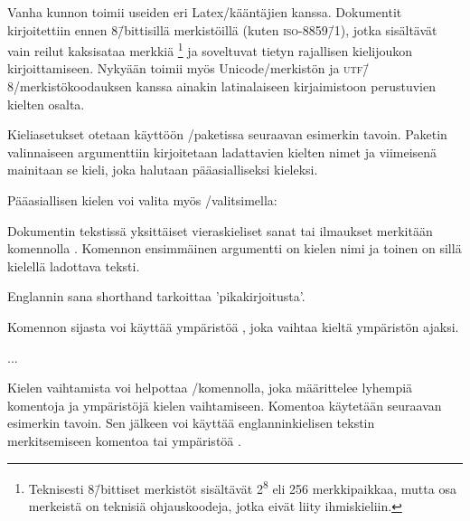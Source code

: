 Vanha kunnon  toimii useiden eri Latex\-/kääntäjien
kanssa. Dokumentit kirjoitettiin ennen 8\=/bittisillä merkistöillä
(kuten \textsc{iso-8859\=/1}), jotka sisältävät vain reilut kaksisataa
merkkiä%
\footnote{Teknisesti 8\=/bittiset merkistöt sisältävät
  2\textsuperscript8 eli 256 merkkipaikkaa, mutta osa merkeistä on
  teknisiä ohjauskoodeja, jotka eivät liity ihmiskieliin.} %
ja soveltuvat tietyn rajallisen kielijoukon kirjoittamiseen. Nykyään
 toimii myös Unicode\-/merkistön ja
\textsc{utf\=/8}\-/merkistökoodauksen kanssa ainakin latinalaiseen
kirjaimistoon perustuvien kielten osalta.

Kieliasetukset otetaan käyttöön \-/paketissa seuraavan
esimerkin tavoin. Paketin valinnaiseen argumenttiin kirjoitetaan
ladattavien kielten nimet ja viimeisenä mainitaan se kieli, joka
halutaan pääasialliseksi kieleksi.

\begin{koodilohkosis}
  \usepackage[english,greek,finnish]{babel}
\end{koodilohkosis}

Pääasiallisen kielen voi valita myös \-/valitsimella:

\begin{koodilohkosis}
  \usepackage[main=finnish,english,greek]{babel}
\end{koodilohkosis}

Dokumentin tekstissä yksittäiset vieraskieliset sanat tai ilmaukset
merkitään komennolla . Komennon
ensimmäinen argumentti on kielen nimi ja toinen on sillä kielellä
ladottava teksti.

\begin{koodilohkosis}
  Englannin sana \foreignlanguage{english}{shorthand} tarkoittaa
  'pikakirjoitusta'.
\end{koodilohkosis}

Komennon sijasta voi käyttää ympäristöä , joka
vaihtaa kieltä ympäristön ajaksi.

\begin{koodilohkosis}
  \begin{otherlanguage}{greek}
    ...
  \end{otherlanguage}
\end{koodilohkosis}

Kielen vaihtamista voi helpottaa \-/komennolla,
joka määrittelee lyhempiä komentoja ja ympäristöjä kielen vaihtamiseen.
Komentoa käytetään seuraavan esimerkin tavoin. Sen jälkeen voi käyttää
englanninkielisen tekstin merkitsemiseen komentoa  tai ympäristöä .

